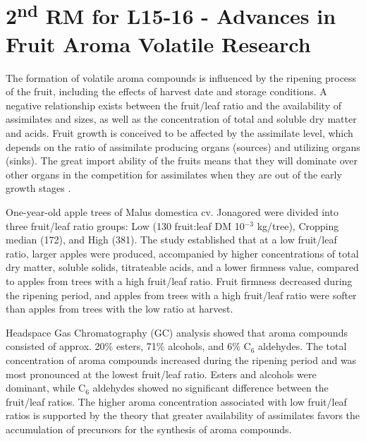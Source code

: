 \section{\texorpdfstring{2\textsuperscript{nd} RM for L15-16 - Advances in Fruit Aroma Volatile Research}{2nd RM for L15-16 - Advances in Fruit Aroma Volatile Research}}

The formation of volatile aroma compounds is influenced by the ripening process of the fruit, including the effects of harvest date and storage conditions. A negative relationship exists between the fruit/leaf ratio and the availability of assimilates and sizes, as well as the concentration of total and soluble dry matter and acids. Fruit growth is conceived to be affected by the assimilate level, which depends on the ratio of assimilate producing organs (sources) and utilizing organs (sinks). The great import ability of the fruits means that they will dominate over other organs in the competition for assimilates when they are out of the early growth stages \cite*{rm_09.2_L15_16_fruit_aroma_volatile_research}.

\vspace{0.5em}
One-year-old apple trees of Malus domestica cv. Jonagored were divided into three fruit/leaf ratio groups: Low (130 fruit:leaf DM 10$^{-3}$ kg/tree), Cropping median (172), and High (381). The study established that at a low fruit/leaf ratio, larger apples were produced, accompanied by higher concentrations of total dry matter, soluble solids, titrateable acids, and a lower firmness value, compared to apples from trees with a high fruit/leaf ratio. Fruit firmness decreased during the ripening period, and apples from trees with a high fruit/leaf ratio were softer than apples from trees with the low ratio at harvest.

\vspace{0.5em}
Headspace Gas Chromatography (GC) analysis showed that aroma compounds consisted of approx. 20\% esters, 71\% alcohols, and 6\% C$_6$ aldehydes. The total concentration of aroma compounds increased during the ripening period and was most pronounced at the lowest fruit/leaf ratio. Esters and alcohols were dominant, while C$_6$ aldehydes showed no significant difference between the fruit/leaf ratios. The higher aroma concentration associated with low fruit/leaf ratios is supported by the theory that greater availability of assimilates favors the accumulation of precursors for the synthesis of aroma compounds.

